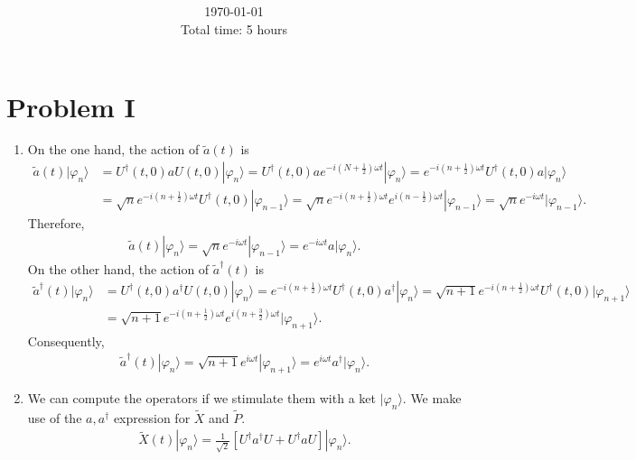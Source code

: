 \documentclass[letterpaper,11pt,twoside]{article}
\title{\textbf{\assignment}\\\course\\{\Large\institution}}
\author{\autor}
\date{\today\\Total time: 5 hours}
\newcommand{\ket}[1]{|#1\rangle}
\begin{document}
\pagestyle{mainstyle}
\maketitle
\section*{Problem I}
\begin{enumerate}[itemsep=0pt,topsep=0pt,label=\alph*)]
  \item On the one hand, the action of $\tilde{a}(t)$ is 
  \begin{align*}
    \tilde{a}(t)\ket{\varphi_n}&=U^\dagger(t,0)aU(t,0)\ket{\varphi_n}=U^\dagger(t,0)ae^{-i\left(N+\frac{1}{2}\right)\omega t}\ket{\varphi_n}=e^{-i\left(n+\frac{1}{2}\right)\omega t}U^\dagger(t,0)a\ket{\varphi_n}\\
    &=\sqrt{n}e^{-i\left(n+\frac{1}{2}\right)\omega t}U^\dagger(t,0)\ket{\varphi_{n-1}}=\sqrt{n}e^{-i\left(n+\frac{1}{2}\right)\omega t}e^{i\left(n-\frac{1}{2}\right)\omega t}\ket{\varphi_{n-1}}=\sqrt{n}e^{-i\omega t}\ket{\varphi_{n-1}}.
  \end{align*}
  Therefore,
  \begin{align*}
    \tilde{a}(t)\ket{\varphi_n}=\sqrt{n}e^{-i\omega t}\ket{\varphi_{n-1}}=e^{-i\omega t}a\ket{\varphi_n}.
  \end{align*}
  On the other hand, the action of $\tilde{a}^\dagger(t)$ is 
  \begin{align*}
    \tilde{a}^\dagger(t)\ket{\varphi_n}&=U^\dagger(t,0)a^\dagger U(t,0)\ket{\varphi_n}=e^{-i\left(n+\frac{1}{2}\right)\omega t}U^\dagger(t,0)a^\dagger\ket{\varphi_n}=\sqrt{n+1}e^{-i\left(n+\frac{1}{2}\right)\omega t}U^\dagger(t,0)\ket{\varphi_{n+1}}\\
    &=\sqrt{n+1}e^{-i\left(n+\frac{1}{2}\right)\omega t}e^{i\left(n+\frac{3}{2}\right)\omega t}\ket{\varphi_{n+1}}.
  \end{align*}
  Consequently,
  \begin{align*}
    \tilde{a}^\dagger(t)\ket{\varphi_n}=\sqrt{n+1}e^{i\omega t}\ket{\varphi_{n+1}}=e^{i\omega t}a^\dagger\ket{\varphi_n}.
  \end{align*}
  \item We can compute the operators if we stimulate them with a ket $\ket{\varphi_n}$. We make use of the $a,a^\dagger$ expression for $\tilde{X}$ and $\tilde{P}$.
  \begin{align*}
    \tilde{X}(t)\ket{\varphi_n}=\frac{1}{\sqrt{2}}\left[U^\dagger a^\dagger U+U^\dagger aU\right]\ket{\varphi_n}.

\end{align*}
\end{enumerate}
\end{document}
